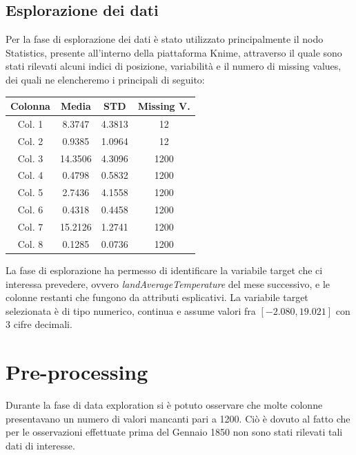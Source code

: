 \documentclass[12pt, a4paper, twocolumn]{article} %
\begin{document}
\subsection{Esplorazione dei dati}
Per la fase di esplorazione dei dati è stato utilizzato principalmente il nodo Statistics, presente all'interno della piattaforma Knime, attraverso il quale sono stati rilevati alcuni indici di posizione, variabilità e il numero di missing values, dei quali ne elencheremo i principali di seguito:
%
\begin{center}
\begin{tabular}{||c c c c||} 
 \hline
 Colonna  & Media & STD & Missing V. \\ [0.5ex] 
 \hline\hline
	Col. 1 &   8.3747 & 4.3813 & 12 \\
\hline\hline
	Col. 2 &   0.9385& 1.0964 & 12 \\
	\hline\hline
	Col. 3 & 14.3506 & 4.3096 & 1200 \\
	\hline\hline
	Col. 4 & 0.4798 & 0.5832 & 1200 \\
	\hline\hline
	Col. 5 &2.7436 & 4.1558 & 1200 \\
	\hline\hline
	Col. 6 & 0.4318 & 0.4458 & 1200 \\
	\hline\hline
	Col. 7 & 15.2126 & 1.2741 & 1200 \\
	\hline\hline
	Col. 8 & 0.1285 & 0.0736 & 1200 \\[0.5ex] \hline 
\end{tabular}
\end{center}

La fase di esplorazione ha permesso di identificare la variabile target che ci interessa prevedere, ovvero \textit{landAverageTemperature} del mese successivo, e le colonne restanti che fungono da attributi esplicativi.
La variabile target selezionata è di tipo numerico, continua e assume valori fra $[-2.080, 19.021]$ con 3 cifre decimali.

\section{Pre-processing}
Durante la fase di data exploration si è potuto osservare che molte colonne presentavano un numero di valori mancanti pari a 1200. Ciò è dovuto al fatto che per le osservazioni effettuate prima del Gennaio 1850 non sono stati rilevati tali dati di interesse. 
\end{document}

